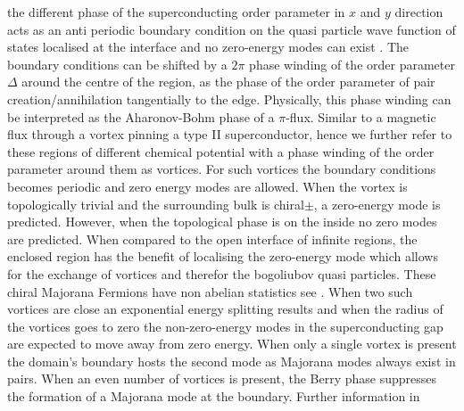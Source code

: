 \documentclass[Master]{subfiles}
\begin{document}
  the different phase of the superconducting order parameter in $x$ and $y$ direction acts as an anti periodic boundary condition on the quasi particle wave function of states localised at the interface and no zero-energy modes can exist \cite{ivanov2001non}. The boundary conditions can be shifted by a $2\pi$ phase winding of the order parameter $\Delta$ around the centre of the region, as the phase of the order parameter of pair creation/annihilation tangentially to the edge. Physically, this phase winding can be interpreted as the Aharonov-Bohm \cite{aharonov1959significance} phase of a $\pi$-flux. Similar to a magnetic flux through a vortex pinning a type II superconductor, hence we further refer to these regions of different chemical potential with a phase winding of the order parameter around them as vortices. For such vortices the boundary conditions becomes periodic and zero energy modes are allowed. When the vortex is topologically trivial and the surrounding bulk is chiral$\pm$, a zero-energy mode is predicted. However, when the topological phase is on the inside no zero modes are predicted. When compared to the open interface of infinite regions, the enclosed region has the benefit of localising the zero-energy mode which allows for the exchange of vortices and therefor the bogoliubov quasi particles. These chiral Majorana Fermions \cite{ivanov2001non} have non abelian statistics see .  When two such vortices are close an exponential energy splitting results and when the radius of the vortices goes to zero the non-zero-energy modes in the superconducting gap are expected to move away from zero energy.  When only a single vortex is present the domain's boundary hosts the second mode as Majorana modes always exist in pairs. When an even number of vortices is present, the Berry phase  suppresses the formation of a Majorana mode at the boundary. Further information in \cite{volovik1999fermion} \cite{ivanov2001non} \cite{stone2004edge}
\end{document}
